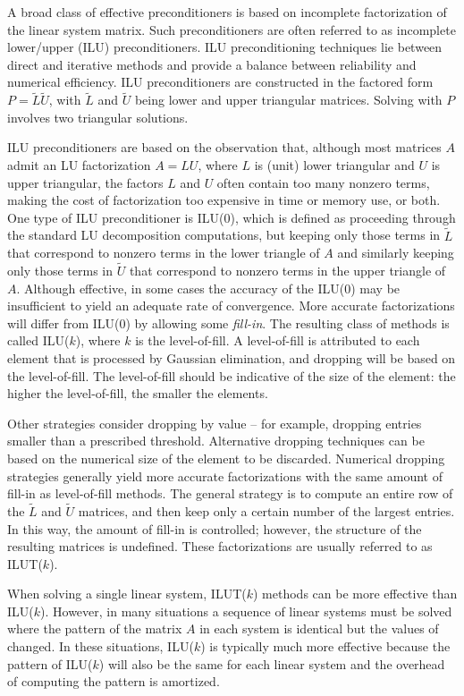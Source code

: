 A broad class of effective preconditioners is based on incomplete
factorization of the linear system matrix.  Such preconditioners are often
referred to as incomplete lower/upper (ILU) preconditioners.  
ILU preconditioning techniques lie between direct and
iterative methods and provide a balance between reliability and
numerical efficiency.  ILU preconditioners are constructed in the factored form
$P=\tilde{L} \tilde{U}$, with $\tilde{L}$ and $\tilde{U}$ being lower
and upper triangular matrices. Solving with $P$ involves two triangular
solutions.

ILU preconditioners are based on the observation
that, although most matrices $A$ admit an LU factorization $A=LU$, where $L$ is
(unit) lower triangular and $U$ is upper triangular, the factors $L$ and $U$ often
contain too many nonzero terms, making the cost of factorization too expensive in
time or memory use, or both.  One type of ILU preconditioner is ILU(0), which 
is defined as proceeding through the standard LU decomposition computations, but keeping 
only those terms in $\tilde{L}$ that correspond to nonzero terms in the lower
triangle of $A$ and similarly keeping only those terms in $\tilde{U}$ that 
correspond to nonzero terms in the upper triangle of $A$.  Although effective, in
some cases the accuracy of the ILU(0) may be insufficient to yield an
adequate rate of convergence. More accurate factorizations will differ
from ILU(0) by allowing some {\em fill-in}. The resulting class of
methods is called ILU($k$), where $k$ is the level-of-fill. A
level-of-fill is attributed to each element that is processed by
Gaussian elimination, and dropping will be based on the level-of-fill.
The level-of-fill should be indicative of the size of the element: the
higher the level-of-fill, the smaller the elements.  

Other strategies consider dropping by value -- for example, dropping
entries smaller than a prescribed threshold. Alternative dropping
techniques can be based on the numerical size of the element to be
discarded. Numerical dropping strategies generally yield more accurate
factorizations with the same amount of fill-in as level-of-fill
methods. The general strategy is to compute an entire row of the
$\tilde{L}$ and $\tilde{U}$ matrices, and then keep only a certain
number of the largest
entries. In this way, the amount of fill-in is
controlled; however, the structure of the resulting matrices is
undefined. These factorizations are usually referred to as ILUT($k$).

When solving a single linear system, ILUT($k$) methods can be more effective
than ILU($k$).  However, in many situations a sequence of linear systems
must be solved where the pattern of the matrix $A$ in each system is
identical but the values of changed.  In these situations, ILU($k$) is 
typically much more effective because the pattern of ILU($k$) will also
be the same for each linear system and the overhead of computing the
pattern is amortized.

